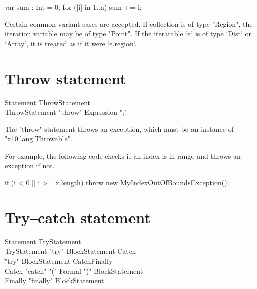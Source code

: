 \begin{xten}
  var sum : Int = 0;
  for ([i] in 1..n) sum += i;
\end{xten}



Certain common variant cases are accepted.  If collection is of type
\xcd"Region", the iteration variable may be of type \xcd"Point". 
If the iteratable \xcd`e` is of type \xcd`Dist` or \xcd`Array`, it is treated
as if it were \xcd`e.region`.  





\section{Throw statement}

\begin{grammar}
Statement \: ThrowStatement \\
ThrowStatement \: \xcd"throw" Expression \xcd";"
\end{grammar}

The \xcd"throw" statement throws an exception, which 
must be an instance of \xcd"x10.lang.Throwable". 

For example, the following code checks if an index is in range and
throws an exception if not.

\begin{xten}
if (i < 0 || i >= x.length)
    throw new MyIndexOutOfBoundsException();
\end{xten}

\section{Try--catch statement}

\begin{grammar}
Statement \: TryStatement \\
TryStatement \: \xcd"try" BlockStatement Catch\plus  \\
             \| \xcd"try" BlockStatement Catch\star Finally \\
Catch \: \xcd"catch" \xcd"(" Formal \xcd")" BlockStatement \\
Finally \: \xcd"finally" BlockStatement \\
\end{grammar}

